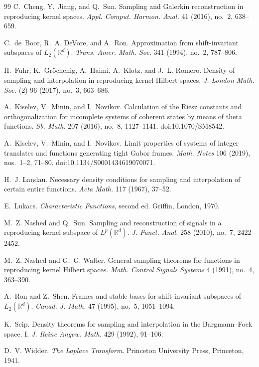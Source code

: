 \begin{thebibliography}{99}
C.~Cheng, Y.~Jiang, and Q.~Sun.
\newblock Sampling and Galerkin reconstruction in reproducing kernel spaces.
\newblock \emph{Appl. Comput. Harmon. Anal.} 41 (2016), no.~2, 638--659.

C.~de~Boor, R.~A. DeVore, and A.~Ron.
\newblock Approximation from shift-invariant subspaces of \(L_2(\mathbb R^d)\).
\newblock \emph{Trans. Amer. Math. Soc.} 341 (1994), no.~2, 787--806.

H.~Fuhr, K.~Gr{\"o}chenig, A.~Haimi, A.~Klotz, and J.~L. Romero.
\newblock Density of sampling and interpolation in reproducing kernel Hilbert
spaces.
\newblock \emph{J. London Math. Soc.} (2) 96 (2017), no.~3, 663--686.

A.~Kiselev, V.~Minin, and I.~Novikov.
\newblock Calculation of the Riesz constants and orthogonalization for
incomplete systems of coherent states by means of theta functions.
\newblock \emph{Sb. Math.} 207 (2016), no.~8, 1127--1141.
\newblock doi:10.1070/SM8542.

A.~Kiselev, V.~Minin, and I.~Novikov.
\newblock Limit properties of systems of integer translates and functions
generating tight Gabor frames.
\newblock \emph{Math. Notes} 106 (2019), nos.~1--2, 71--80.
\newblock doi:10.1134/S0001434619070071.

H.~J. Landau.
\newblock Necessary density conditions for sampling and interpolation of
certain entire functions.
\newblock \emph{Acta Math.} 117 (1967), 37--52.

E.~Lukacs.
\newblock \emph{Characteristic Functions}, second ed.
\newblock Griffin, London, 1970.

M.~Z. Nashed and Q.~Sun.
\newblock Sampling and reconstruction of signals in a reproducing kernel
subspace of \(L^p(\mathbb R^d)\).
\newblock \emph{J. Funct. Anal.} 258 (2010), no.~7, 2422--2452.

M.~Z. Nashed and G.~G. Walter.
\newblock General sampling theorems for functions in reproducing kernel
Hilbert spaces.
\newblock \emph{Math. Control Signals Systems} 4 (1991), no.~4, 363--390.

A.~Ron and Z.~Shen.
\newblock Frames and stable bases for shift-invariant subspaces of
\(L_2(\mathbb R^d)\).
\newblock \emph{Canad. J. Math.} 47 (1995), no.~5, 1051--1094.

K.~Seip.
\newblock Density theorems for sampling and interpolation in the
Bargmann--Fock space. I.
\newblock \emph{J. Reine Angew. Math.} 429 (1992), 91--106.

D.~V. Widder.
\newblock \emph{The Laplace Transform}.
\newblock Princeton University Press, Princeton, 1941.

\end{thebibliography}

